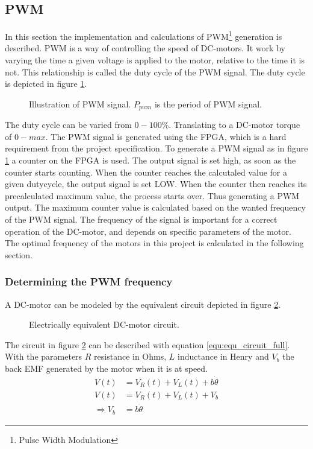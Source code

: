 \documentclass[../../../Main]{subfiles}
\begin{document}
\subsection{PWM}
In this section the implementation and calculations of PWM\footnote{Pulse Width Modulation} generation is described. PWM is a way of controlling the speed of DC-motors. It work by varying the time a given voltage is applied to the motor, relative to the time it is not. This relationship is called the duty cycle of the PWM signal. The duty cycle is depicted in figure \ref{fig:pwm}.

\begin{figure}[h]
  
  \caption{Illustration of PWM signal. $P_{pwm}$ is the period of PWM signal.}
  \label{fig:pwm}
\end{figure}

The duty cycle can be varied from $0 - 100\%$. Translating to a DC-motor torque of $0 - max$.
The PWM signal is generated using the FPGA, which is a hard requirement from the project  specification. To generate a PWM signal as in figure \ref{fig:pwm} a counter on the FPGA  is used.
The output signal is set high, as soon as the counter starts counting. When the counter reaches the calcutaled value for a given dutycycle, the output signal is set LOW. When the counter then reaches its precalculated maximum value, the process starts over. Thus generating a PWM output. The maximum counter value is calculated based on the wanted frequency of the PWM signal. The frequency of the signal is important for a correct operation of the DC-motor, and depends on specific parameters of the motor. The optimal frequency of the motors in this project is calculated in the following section.
\newpage
\subsubsection{Determining the PWM frequency}

A DC-motor can be modeled by the equivalent circuit depicted in figure \ref{fig:electrical_equ}.

\begin{figure}[ht]
	\center
    \def\svgwidth{0.5\textwidth}
	
	\caption{Electrically equivalent DC-motor circuit.}
  \label{fig:electrical_equ}
\end{figure}
The circuit in figure \ref{fig:electrical_equ} can be described with equation \ref{equ:equ_circuit_full}. With the parameters $R$ resistance in Ohms, $L$ inductance in Henry and $V_b$ the back EMF generated by the motor when it is at speed.
\begin{align}
	V(t) &= V_R(t) + V_L(t) + b\dot{\theta}\\
 \label{equ:equ_circuit_full}
	V(t) &= V_R(t) + V_L(t) + V_b\\
	\Rightarrow V_b &= b\dot{\theta}
\end{align}
\end{document}
